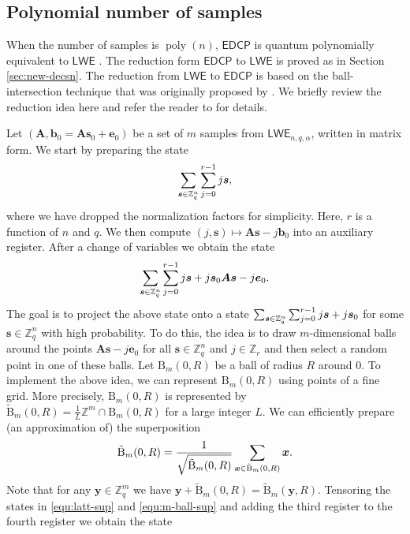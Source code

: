 \documentclass[11pt]{article}
\theoremstyle{plain}
\theoremstyle{definition}
\DeclareMathOperator{\poly}{poly}
\let\ket\relax
\DeclarePairedDelimiter{\ket}{\lvert}{\rangle}
\def\Z{\mathbb{Z}}
\def\lwe{\mathsf{LWE}}
\def\edcp{\mathsf{EDCP}}
\begin{document}
\subsection{Polynomial number of samples}
\label{sec:hardness-poly}

When the number of samples is $\poly(n)$, $\edcp$ is quantum polynomially equivalent to $\lwe$ \cite{brakerski2018learning}. The reduction form $\edcp$ to $\lwe$ is proved as in Section \ref{sec:new-decsn}. The reduction from $\lwe$ to $\edcp$ is based on the ball-intersection technique that was originally proposed by \cite{regev2004quantum}. We briefly review the reduction idea here and refer the reader to \cite{regev2004quantum, brakerski2018learning} for details.

Let $(\bm{A}, \bm{b}_0 = \bm{As}_0 + \bm{e}_0)$ be a set of $m$ samples from $\lwe_{n, q, \alpha}$, written in matrix form. We start by preparing the state 
\[ \sum_{\bm{s} \in \Z_q^n} \sum_{j = 0}^{r - 1} \ket{j}\ket{\bm{s}}, \]
where we have dropped the normalization factors for simplicity. Here, $r$ is a function of $n$ and $q$. We then compute $(j, \bm{s}) \mapsto \bm{As} - j\bm{b}_0$ into an auxiliary register. After a change of variables we obtain the state
\begin{equation}
    \label{equ:latt-sup}
    \sum_{\bm{s} \in \Z_q^n} \sum_{j = 0}^{r - 1} \ket{j}\ket{\bm{s} + j\bm{s}_0}\ket{\bm{As} - j\bm{e}_0}.
\end{equation}
The goal is to project the above state onto a state $\sum_{\bm{s} \in \Z_q^n} \sum_{j = 0}^{r - 1} \ket{j}\ket{\bm{s} + j\bm{s}_0}$ for some $\bm{s} \in \Z_q^n$ with high probability. To do this, the idea is to draw $m$-dimensional balls around the points $\bm{As} - j\bm{e}_0$ for all $\bm{s} \in \Z_q^n$ and $j \in \Z_r$ and then select a random point in one of these balls. Let $\mathrm{B}_m(0, R)$ be a ball of radius $R$ around $0$. To implement the above idea, we can represent $\mathrm{B}_m(0, R)$ using points of a fine grid. More precisely, $\mathrm{B}_m(0, R)$ is represented by $\tilde{\mathrm{B}}_m(0, R) = \frac{1}{L} \Z^m \cap \mathrm{B}_m(0, R)$ for a large integer $L$. We can efficiently prepare (an approximation of) the superposition
\begin{equation}
    \label{equ:m-ball-sup}
    \ket{\tilde{\mathrm{B}}_m(0, R)} = \frac{1}{\sqrt{\tilde{\mathrm{B}}_m(0, R)}} \sum_{\bm{x} \in \tilde{\mathrm{B}}_m(0, R)} \ket{\bm{x}}.
\end{equation}
Note that for any $\bm{y} \in \Z_q^m$ we have $\bm{y} + \tilde{\mathrm{B}}_m(0, R) = \tilde{\mathrm{B}}_m(\bm{y}, R)$. Tensoring the states in \eqref{equ:latt-sup} and \eqref{equ:m-ball-sup} and adding the third register to the fourth register we obtain the state
\end{document}
